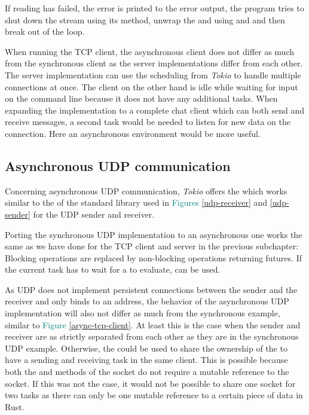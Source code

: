 If reading has failed, the error is printed to the error output, the program tries to shut down the stream using its
 method, unwrap the  and  using  and  and then break out
of the loop.

When running the TCP client, the asynchronous client does not differ as much from the synchronous client as the server
implementations differ from each other. The server implementation can use the scheduling from \textit{Tokio} to handle
multiple connections at once. The client on the other hand is idle while waiting for input on the command line because
it does not have any additional tasks. When expanding the implementation to a complete chat client which can both send
and receive messages, a second task would be needed to listen for new data on the connection. Here an asynchronous
environment would be more useful.

\subsection{Asynchronous UDP communication}
Concerning asynchronous UDP communication, \textit{Tokio} offers the   which
works similar to the  of the standard library used in \textcolor{teal}{Figures \ref{udp-receiver}} and
\textcolor{teal}{\ref{udp-sender}} for the UDP sender and receiver.

Porting the synchronous UDP implementation to an asynchronous one works the same as we have done for the TCP client and
server in the previous subchapter: Blocking operations are replaced by non-blocking operations returning futures. If
the current task has to wait for a  to evaluate,  can be used.

As UDP does not implement persistent connections between the sender and the receiver and only binds to an address, the
behavior of the asynchronous UDP implementation will also not differ as much from the synchronous example, similar to
\textcolor{teal}{Figure \ref{async-tcp-client}}. At least this is the case when the sender and receiver are as strictly
separated from each other as they are in the synchronous UDP example. Otherwise, the 
 could be used to share the ownership of the  to have a sending and receiving task
in the same client. This is possible because both the  and  methods of the socket do not
require a mutable reference to the socket. If this was not the case, it would not be possible to share one socket for
two tasks as there can only be one mutable reference to a certain piece of data in Rust.
